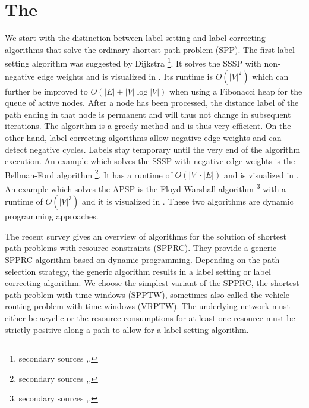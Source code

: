 \section{The }
We start with the distinction between label-setting \cite[ch. 4]{ahuja1993network} and label-correcting \cite[ch. 5]{ahuja1993network} algorithms that solve the ordinary shortest path problem (SPP).
The first label-setting algorithm was suggested by Dijkstra \cite{dijkstra1959note}\footnote{secondary sources \cite[sec. 4.5]{ahuja1993network},\cite[sec. 24.3]{cormen2009introduction},\cite[sec. 3.7, p. 83]{jungnickel2013graphs}}. It solves the SSSP with non-negative edge weights and is visualized in \cite{velden2014idp}. Its runtime is $O(|V|^2)$ which can further be improved to $O(|E| + |V| \log |V|)$ when using a Fibonacci heap for the queue of active nodes. After a node has been processed, the distance label of the path ending in that node is permanent and will thus not change in subsequent iterations. The algorithm is a greedy method and is thus very efficient.
On the other hand, label-correcting algorithms allow negative edge weights and can detect negative cycles. Labels stay temporary until the very end of the algorithm execution. An example which solves the SSSP with negative edge weights is the Bellman-Ford algorithm \cite{bellman1958routing,ford1962flows}\footnote{secondary sources \cite[sec. 5.4]{ahuja1993network},\cite[sec. 24.1]{cormen2009introduction},\cite[sec. 3.7, p. 87]{jungnickel2013graphs}}. It has a runtime of $O(|V|\cdot|E|)$ and is visualized in \cite{storz2013idp}. An example which solves the APSP is the Floyd-Warshall algorithm \cite{floyd1962algorithm,warshall1962theorem}\footnote{secondary sources \cite[sec. 5.6]{ahuja1993network},\cite[sec. 25.2]{cormen2009introduction},\cite[sec. 3.9]{jungnickel2013graphs}} with a runtime of $O(|V|^3)$ and it is visualized in \cite{becker2015idp}. These two algorithms are dynamic programming approaches. 

The recent survey \cite{irnich2005shortest} gives an overview of algorithms for the solution of shortest path problems with resource constraints (SPPRC). They provide a generic SPPRC algorithm based on dynamic programming. Depending on the path selection strategy, the generic algorithm results in a label setting or label correcting algorithm. We choose the simplest variant of the SPPRC, the shortest path problem with time windows (SPPTW), sometimes also called the vehicle routing problem with time windows (VRPTW). The underlying network must either be acyclic or the resource consumptions for at least one resource must be strictly positive along a path to allow for a label-setting algorithm. 

